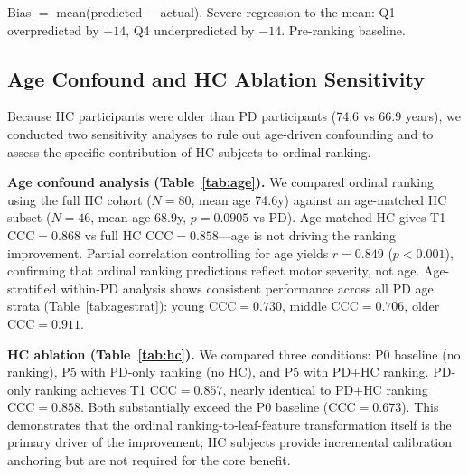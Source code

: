 \documentclass[11pt,a4paper]{article}
\newcommand{\tabnote}[1]{\par\vspace{2pt}\noindent\begin{minipage}{\linewidth}\small\itshape\raggedright #1\par\end{minipage}\par\vspace{0.4em}}
\begin{document}
\begin{table}[H]
\centering
\caption{Severity-stratified prediction (baseline, PD-only FM LOOCV, $N=98$).}
\label{tab:severity}
%
\tabnote{Bias $=$ mean(predicted $-$ actual). Severe regression to the mean: Q1 overpredicted by $+14$, Q4 underpredicted by $-14$. Pre-ranking baseline.}
\end{table}

\subsection{Age Confound and HC Ablation Sensitivity}

Because HC participants were older than PD participants (74.6 vs 66.9 years), we conducted two sensitivity analyses to rule out age-driven confounding and to assess the specific contribution of HC subjects to ordinal ranking.

\textbf{Age confound analysis (Table~\ref{tab:age}).} We compared ordinal ranking using the full HC cohort ($N=80$, mean age 74.6y) against an age-matched HC subset ($N=46$, mean age 68.9y, $p=0.0905$ vs PD). Age-matched HC gives T1 $\mathrm{CCC}=0.868$ vs full HC $\mathrm{CCC}=0.858$---age is not driving the ranking improvement. Partial correlation controlling for age yields $r=0.849$ ($p<0.001$), confirming that ordinal ranking predictions reflect motor severity, not age. Age-stratified within-PD analysis shows consistent performance across all PD age strata (Table~\ref{tab:agestrat}): young $\mathrm{CCC}=0.730$, middle $\mathrm{CCC}=0.706$, older $\mathrm{CCC}=0.911$.

\textbf{HC ablation (Table~\ref{tab:hc}).} We compared three conditions: P0 baseline (no ranking), P5 with PD-only ranking (no HC), and P5 with PD+HC ranking. PD-only ranking achieves T1 $\mathrm{CCC}=0.857$, nearly identical to PD+HC ranking $\mathrm{CCC}=0.858$. Both substantially exceed the P0 baseline ($\mathrm{CCC}=0.673$). This demonstrates that the ordinal ranking-to-leaf-feature transformation itself is the primary driver of the improvement; HC subjects provide incremental calibration anchoring but are not required for the core benefit.
\end{document}
